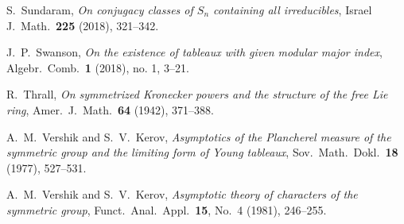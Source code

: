 \documentclass[12pt]%
{amsart}
\def\red#1{{\color{red}{#1}}}
\theoremstyle{plain}
\theoremstyle{definition}
\theoremstyle{remark}
\begin{document}
\begin{thebibliography}{}
    S.\ Sundaram, 
    {\em On conjugacy classes of  $S_n$  containing all irreducibles}, 
    Israel J.\ Math.~{\bf 225} (2018), 321--342.


    J.\ P.\ Swanson, 
    {\em On the existence of tableaux with given modular major index}, 
    Algebr.\ Comb.~{\bf 1} (2018), no. 1, 3--21.

    R.\ Thrall, 
    {\em On symmetrized Kronecker powers and the structure of the free Lie ring}, 
    Amer.\ J.\ Math.\ {\bf 64} (1942), 371--388. 


    A.\ M.\ Vershik and S.\ V.\ Kerov,
    {\em Asymptotics of the Plancherel measure of the symmetric group and the limiting form of Young tableaux},
    Sov.\ Math.\ Dokl.\ {\bf 18} (1977), 527--531.

    A.\ M.\ Vershik and S.\ V.\ Kerov,
    {\em Asymptotic theory of characters of the symmetric group},
    Funct.\ Anal.\ Appl.\ {\bf 15}, No.~4 (1981), 246--255.

\end{thebibliography}
    
\end{document}
